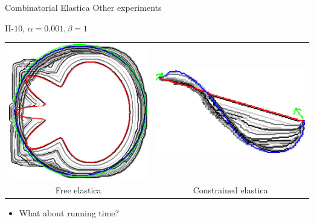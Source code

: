 \begin{frame}
	{Combinatorial Elastica}
	{Other experiments}
\begin{center}
II-$10$, $\alpha=0.001, \beta=1$

\vspace{1em}
	
\begin{tabular}{cc}
\includegraphics[scale=0.25]{figures/combinatorial-elastica/other-experiments/ii/elastica/len_pen_0.001000/jonctions_1/curve_segs_4/best/gs_0.25000/flower.png}&
\includegraphics[scale=0.25]{figures/combinatorial-elastica/other-experiments/ii/elastica/len_pen_0.001000/jonctions_1/curve_segs_4/best/gs_0.25000/curve.png}\\
Free elastica & Constrained elastica
\end{tabular}
\end{center}

\vspace{1em}
\pause

\begin{itemize}
\item{What about running time?}
\end{itemize}

\end{frame}

